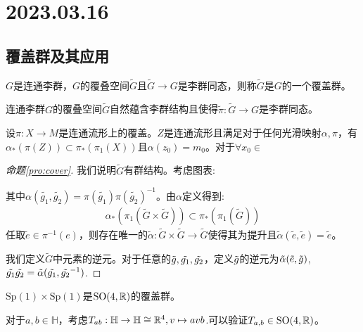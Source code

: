     \chapter{2023.03.16}
    \section{覆盖群及其应用}
    \begin{definition}
        $G$是连通李群，$G$的覆叠空间$\tilde{G}$且$\tilde{G} \to G$是李群同态，则称$\tilde{G}$是$G$的一个覆盖群。
    \end{definition}
    \begin{proposition}\label{pro:cover}
        连通李群$G$的覆叠空间$\tilde{G}$自然蕴含李群结构且使得$\tilde{\pi}:\tilde{G}\to G$是李群同态。
    \end{proposition}
    \begin{lemma}
        设$\pi:X \to M$是连通流形上的覆盖。$Z$是连通流形且满足对于任何光滑映射$\alpha,\pi$，有$\alpha_* (\pi(Z))\subset \pi_*(\pi_1(X))$且$\alpha(z_0)=m_0$。对于$\forall x_0 \in$ 
    \end{lemma}
    \begin{proof}[命题\ref{pro:cover}]
        我们说明$\tilde{G}$有群结构。考虑图表:

    其中$\alpha(\tilde{g_1},\tilde{g_2})=\pi(\tilde{g_1})\pi(\tilde{g_2})^{-1}$。由$\alpha$定义得到:
    \begin{align}
        \alpha_*(\pi_1(\tilde{G}\times \tilde{G}))\subset \pi_*(\pi_1(\tilde{G}))
    \end{align}
    任取$\tilde{e}\in \pi^{-1}(e)$，则存在唯一的$\tilde{\alpha}:\tilde{G} \times \tilde{G} \to \tilde{G}$使得其为提升且$\tilde{\alpha}(\tilde{e},\tilde{e})=\tilde{e}$。

    我们定义$\tilde{G}$中元素的逆元。对于任意的$\tilde{g},\tilde{g_1},\tilde{g_2}$，定义$\tilde{g}$的逆元为$\tilde{\alpha}(\tilde{e},\tilde{g})$,$\tilde{g_1}\tilde{g_2}=\tilde{\alpha}(\tilde{g_1},\tilde{g_2}^{-1})$.
\end{proof}
\begin{example}
    $\mathrm{Sp}(1) \times \mathrm{Sp}(1)$是$\mathrm{SO}(4,\mathbb{R})$的覆盖群。

    对于$a,b \in \mathbb{H}$，考虑$T_{ab}:\mathbb{H} \to \mathbb{H} \cong \mathbb{R}^4,v \mapsto avb$.可以验证$T_{a,b}\in \mathrm{SO}(4,\mathbb{R})$。
\end{example}

